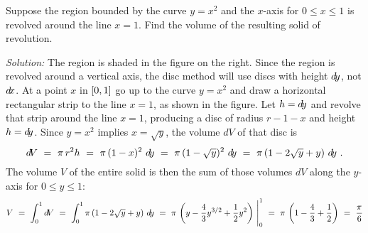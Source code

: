 \begin{exmp}
\noindent Suppose the region bounded by the curve $y=x^2$ and the $x$-axis
for $0 \le x \le 1$ is revolved around the line $x=1$. Find the
volume of the resulting solid of revolution.\vspace{0.5mm}
\par\noindent\emph{Solution:} The region is shaded in the figure on the right.
Since the region is revolved around a vertical axis, the disc method
will use discs with height $d\!y$, not $d\!x$.
At a point $x$ in $\lbrack 0,1 \rbrack$ go up to the curve $y=x^2$ and draw a horizontal
rectangular strip to the line $x=1$, as shown in the figure. Let
$h=d\!y$ and revolve that strip around the line $x=1$, producing a disc of radius
$r-1-x$ and height $h=d\!y$. Since $y=x^2$ implies $x=\sqrt{y}$, the volume
$d\!V$ of that disc is
\[
d\!V ~=~ \pi\,r^2 h ~=~ \pi\,(1-x)^2~d\!y ~=~ \pi\,(1-\sqrt{y})^2~d\!y ~=~
\pi\,(1 - 2\sqrt{y} + y)~d\!y ~.
\]
The volume $V$ of the entire solid is then the sum of those volumes $d\!V$ along
the $y$-axis for $0\le y\le 1$:
\[
V ~=~ \int_0^1 d\!V ~=~ \int_0^1 \pi\,(1 - 2\sqrt{y} + y)~d\!y ~=~
\pi\,\left(y - \frac{4}{3}y^{3/2} + \frac{1}{2}y^2 \right)~\Biggr|_0^1 ~=~
\pi\,\left(1 - \frac{4}{3} + \frac{1}{2}\right) ~=~ \frac{\pi}{6}
\]
\end{exmp}
\divider
\vspace{2mm}

